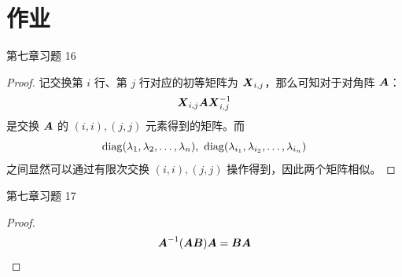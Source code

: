 \section{作业}

\begin{problem}
	第七章习题 16

	\begin{proof}
		记交换第 $i$ 行、第 $j$ 行对应的初等矩阵为 $\boldsymbol{X}_{i,j}$，那么可知对于对角阵 $\boldsymbol{A}$：
		$$
		\boldsymbol{X}_{i,j} \boldsymbol{A} \boldsymbol{X}_{i,j}^{-1}
		$$
		是交换 $\boldsymbol{A}$ 的 $(i, i), (j, j)$ 元素得到的矩阵。而
		$$
		\operatorname{diag}(\lambda_1, \lambda_2, \dots, \lambda_n),\ \operatorname{diag}(\lambda_{i_1}, \lambda_{i_2}, \dots, \lambda_{i_n})
		$$
		之间显然可以通过有限次交换 $(i, i), (j, j)$ 操作得到，因此两个矩阵相似。
	\end{proof}
\end{problem}

\begin{problem}
	第七章习题 17
	\begin{proof}
		$$
		\boldsymbol{A}^{-1} (\boldsymbol{A} \boldsymbol{B}) \boldsymbol{A} = \boldsymbol{B} \boldsymbol{A}
		$$
	\end{proof}
\end{problem}

